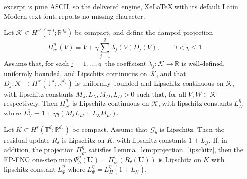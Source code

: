 \documentclass[10pt,a4paper]{amsart}
\begin{document}
excerpt is pure ASCII, so the delivered engine, XeLaTeX with its default Latin Modern text font, reports no missing character.
\begin{lemma}
\label{lem:projection_lipschitz}
Let \(\mathcal K\subset H^{s'}(\mathbb T^d;\mathbb R^{d_u})\) be compact, and define the damped projection
\[
    \Pi_{\mathbf c^\star}^{\eta}(V)
    =
    V+\eta\sum_{j=1}^{q}\lambda_j(V)D_j(V),
    \qquad 0<\eta\le 1 .
\]
Assume that, for each \(j=1,\ldots,q\), the coefficient \(\lambda_j:\mathcal K\to\mathbb R\) is well-defined, uniformly bounded, and Lipschitz continuous on \(\mathcal K\), and that \(D_j:\mathcal K\to H^{s'}(\mathbb T^d;\mathbb R^{d_u})\) is uniformly bounded and Lipschitz continuous on \(\mathcal K\), with lipschitz constants \(M_\lambda,L_\lambda,M_D,L_D>0\) such that, for all \(V,W\in\mathcal K\) respectively.
Then \(\Pi_{\mathbf c^\star}^{\eta}\) is Lipschitz continuous on \(\mathcal K\), with lipschitz constants $ L_\Pi^\eta$
where
$
    L_\Pi^\eta
    =
    1+\eta q(M_\lambda L_D+L_\lambda M_D).
$
\end{lemma}

\begin{lemma}
\label{lem:epfno_map_lipschitz}
Let \(K\subset H^s(\mathbb T^d;\mathbb R^{d_a})\) be compact. Assume that \(\mathcal G_\theta\) is Lipschitz.
Then the residual update \(R_\theta\) is Lipschitz on \(K\), with lipschitz constants  $1+L_\mathcal G$.
If, in addition, the projection \(\Pi_{\mathbf c^\star}^{\eta}\) satisfies
Lemma~\ref{lem:projection_lipschitz}, then the EP-FNO one-step map
$
    \Psi_h^\eta(\mathbf U)
    =
    \Pi_{\mathbf c^\star}^{\eta}
    \left(
    R_\theta(\mathbf U)
    \right)
$
is Lipschitz on \(K\) with lipschitz constant  $L_\Psi^\eta$ 
where
$
    L_\Psi^\eta
    =
    L_\Pi^\eta(1+L_{\mathcal G}).
$
\end{lemma}
\end{document}

